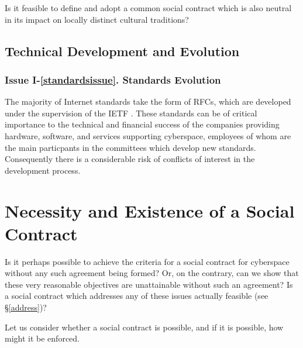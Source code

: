 Is it feasible to define and adopt a common social contract which is also neutral in its
impact on locally distinct cultural traditions?

\subsection{Technical Development and Evolution}\label{evolution}

\subsubsection*{Issue I-\ref{standardsissue}. {Standards Evolution}}\label{standardssol}
%
The majority of Internet standards take the form of RFCs, \cite{RFCs}
which are developed under the supervision of the IETF \cite{ietf}.
These standards can be of critical importance to the technical and
financial success of the companies providing hardware, software, and
services supporting cyberspace, employees of whom are the main particpants
in the committees which develop new standards. Consequently there is a considerable
risk of conflicts of interest in the development process.


\section{Necessity and Existence of a Social Contract}\label{necessity}

Is it perhaps possible to achieve the criteria for a social contract for cyberspace
without any such agreement being formed? Or, on the contrary, can we show that
these very reasonable objectives are unattainable without such an agreement?
Is a social contract which addresses any of these issues actually feasible
(see \S\ref{address})?

Let us consider whether a social contract is possible, 
and if it is possible, how might it be enforced.

